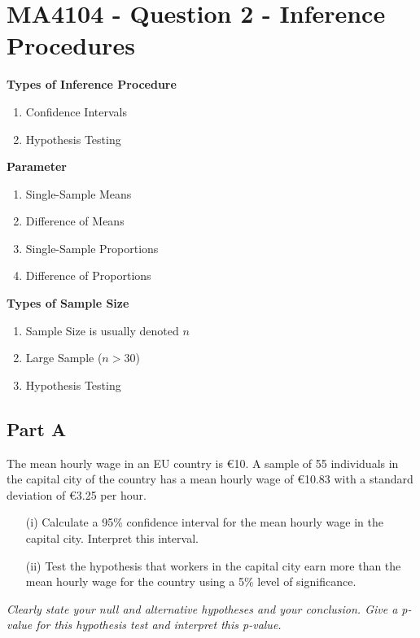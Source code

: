 \documentclass[]{article}
\begin{document}
\Large

\section*{MA4104 - Question 2 - Inference Procedures}
\begin{framed}
\noindent \textbf{Types of Inference Procedure}
\begin{enumerate}
	\item Confidence Intervals
	\item Hypothesis Testing
\end{enumerate}
\end{framed}
\medskip
\begin{framed}
\noindent \textbf{Parameter}
\begin{enumerate}
	\item Single-Sample Means
	\item Difference of Means
	\item Single-Sample Proportions
		\item Difference of Proportions
\end{enumerate}
\end{framed}
\medskip
\begin{framed}
\noindent \textbf{Types of Sample Size}
\begin{enumerate}
	\item Sample Size is usually denoted $n$
	\item Large Sample ($n>30$)
	\item Hypothesis Testing
\end{enumerate}
\end{framed}
\newpage
\subsection*{Part A}The mean hourly wage in an EU country is €10. A sample of 55 individuals in the capital city of the country has a mean hourly wage of €10.83 with a standard deviation of €3.25 per hour.

\begin{itemize}
\item[(i)] Calculate a 95\% confidence interval for the mean hourly wage in the capital city. Interpret this interval.

\item[(ii)] Test the hypothesis that workers in the capital city earn more than the mean hourly wage for the country using a 5\% level of significance. 
\end{itemize}
\textit{Clearly state your null and alternative hypotheses and your conclusion. Give a p-value for this hypothesis test and interpret this p-value.}
\end{document}
